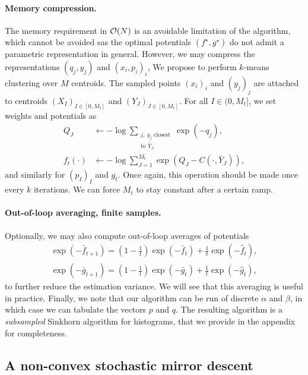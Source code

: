 \paragraph{Memory compression.} The memory requirement in $\mathcal{O}(N)$ is an
avoidable limitation of the algorithm, which cannot be avoided sas the optimal
potentials $(f^\star, g^\star)$ do not admit a parametric representation in
general. However, we may compress the representations $(q_j, y_j)$ and $(x_i,
p_i)_i$, We propose to perform $k$-means clustering over $M$ centroids. The
sampled points $(x_i)_i$ and $(y_j)_j$ are attached to centroids ${(X_I)}_{I \in
[0,M_t]}$ and ${(Y_J)}_{J \in [0,M_t]}$. For all $I \in (0, M_t]$, we set
weights and potentials as
\begin{align}
    Q_J &\gets - \log \sum_{\substack{j,\:y_j \text{ closest}\\\text{to } \bar Y_J}}
     \exp(-q_j),\\
    f_t(\cdot) &\gets - \log\sum_{J=1}^{M_t} \exp(Q_J - C(\cdot, \bar Y_J)),
\end{align}
and similarly for $(p_I)_I$ and $g_t$. Once again, this operation should be made
once every $k$ iterations. We can force $M_t$ to stay constant after a certain
ramp.

\paragraph{Out-of-loop averaging, finite samples.} Optionally, we may also
compute out-of-loop averages of potentials
\begin{align}
    \exp(-\bar f_{t+1}) = (1 - \frac{1}{t}) \exp(-\bar f_t) + \frac{1}{t} \exp(-\hat f_t), \\
    \exp(-\bar g_{t+1}) = (1 - \frac{1}{t}) \exp(-\bar g_t) + \frac{1}{t} \exp(-\hat g_t),
\end{align}
to further reduce the estimation variance. We will see that this averaging is
useful in practice. Finally, we note that our algorithm can be run of discrete
$\alpha$ and $\beta$, in which case we can tabulate the vectors $p$ and $q$. The resulting
algorithm is a \textit{subsampled} Sinkhorn algorithm for histograms, that we provide in the
appendix for completeness.

\subsection{A non-convex stochastic mirror descent}

